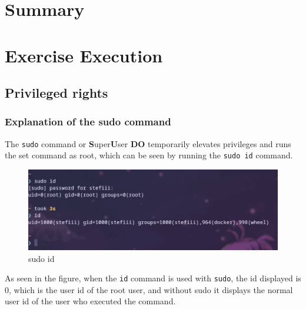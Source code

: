 \documentclass[a4paper]{article}
\newcommand{\abc}{\hfill \break}
\begin{document}
\section{Summary}


\newpage

\section{Exercise Execution}

\subsection{Privileged rights}
\subsubsection{Explanation of the sudo command}
The \texttt{sudo} command or \textbf{S}uper\textbf{U}ser \textbf{DO} temporarily elevates privileges and runs the set command as root, which can be seen by running the \texttt{sudo id} command.\cite{sudo}

\begin{figure}[h]
	\centering
	\includegraphics[scale=0.4]{images/sudoid.png}
	\caption{sudo id}
\end{figure} \abc
As seen in the figure, when the \texttt{id} command is used with \texttt{sudo}, the id displayed is 0, which is the user id of the root user, and without sudo it displays the normal user id of the user who executed the command.
\end{document}
